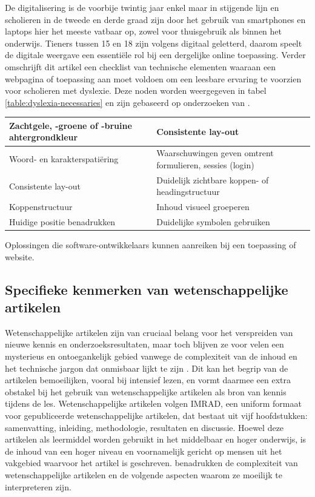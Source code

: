 De digitalisering is de voorbije twintig jaar enkel maar in stijgende lijn en scholieren in de tweede en derde graad zijn door het gebruik van smartphones en laptops hier het meeste vatbaar op, zowel voor thuisgebruik als binnen het onderwijs. Tieners tussen 15 en 18 zijn volgens \textcite{Harvard2023} digitaal geletterd, daarom speelt de digitale weergave een essentiële rol bij een dergelijke online toepassing. Verder omschrijft dit artikel een checklist van technische elementen waaraan een webpagina of toepassing aan moet voldoen om een leesbare ervaring te voorzien voor scholieren met dyslexie. Deze noden worden weergegeven in tabel \ref{table:dyslexia-necessaries} en zijn gebaseerd op onderzoeken van \textcite{Santana2012, Harvard2023}.

\begin{center}
	\begin{tabular}{ | m{8cm} | m{8cm} | } 
		\hline
		Zachtgele, -groene of -bruine ahtergrondkleur & Consistente lay-out \\
		\hline
		Woord- en karakterspatiëring & Waarschuwingen geven omtrent formulieren, sessies (login) \\ 
		\hline
		Consistente lay-out & Duidelijk zichtbare koppen- of headingstructuur \\ 
		\hline
		Koppenstructuur &  Inhoud visueel groeperen \\
		\hline
		Huidige positie benadrukken & Duidelijke symbolen gebruiken \\
		\hline
	\end{tabular}
	\caption{Oplossingen die software-ontwikkelaars kunnen aanreiken bij een toepassing of website.}
	\label{table:dyslexia-necessaries}
\end{center}

\subsection{Specifieke kenmerken van wetenschappelijke artikelen}

Wetenschappelijke artikelen zijn van cruciaal belang voor het verspreiden van nieuwe kennis en onderzoeksresultaten, maar toch blijven ze voor velen een mysterieus en ontoegankelijk gebied vanwege de complexiteit van de inhoud en het technische jargon dat onmisbaar lijkt te zijn \autocite{Ball2017}. Dit kan het begrip van de artikelen bemoeilijken, vooral bij intensief lezen, en vormt daarmee een extra obstakel bij het gebruik van wetenschappelijke artikelen als bron van kennis tijdens de les. Wetenschappelijke artikelen volgen IMRAD, een uniform formaat voor gepubliceerde wetenschappelijke artikelen, dat bestaat uit vijf hoofdstukken: samenvatting, inleiding, methodologie, resultaten en discussie. Hoewel deze artikelen als leermiddel worden gebruikt in het middelbaar en hoger onderwijs, is de inhoud van een hoger niveau en voornamelijk gericht op mensen uit het vakgebied waarvoor het artikel is geschreven. \textcite{Pain2016, CAS2021} benadrukken de complexiteit van wetenschappelijke artikelen en de volgende aspecten waarom ze moeilijk te interpreteren zijn.

